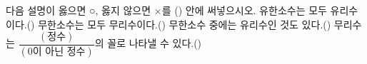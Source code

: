 다음 설명이 옳으면 ○, 옳지 않으면 ×를 (\quad) 안에 써넣으시오.
 유한소수는 모두 유리수이다.\hfill(\qquad)
 무한소수는 모두 무리수이다.\hfill(\qquad)
 무한소수 중에는 유리수인 것도 있다.\hfill(\qquad)
 무리수는 $\dfrac{(\text{정수})}{(\text{0이 아닌 정수})}$의 꼴로 나타낼 수 있다.\hfill(\qquad)
